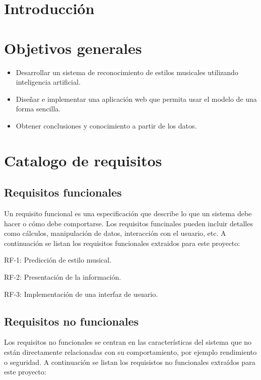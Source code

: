 
\section{Introducción}

\section{Objetivos generales}

\begin{itemize}
\tightlist
\item Desarrollar un sistema de reconocimiento de estilos musicales utilizando inteligencia artificial.
\item Diseñar e implementar una aplicación web que permita usar el modelo de una forma sencilla.
\item Obtener conclusiones y conocimiento a partir de los datos.
\end{itemize}

\section{Catalogo de requisitos}

\subsection{Requisitos funcionales}

Un requisito funcional es una especificación que describe lo que un sistema debe hacer o cómo debe comportarse.
Los requisitos funcinales pueden incluir detalles como cálculos, manipulación de datos, interacción con el usuario, etc.
A continuación se listan los requisitos funcionales extraidos para este proyecto:

RF-1: Predicción de estilo musical.

RF-2: Presentación de la información.

RF-3: Implementación de una interfaz de usuario.

\subsection{Requisitos no funcionales}

Los requisitos no funcionales se centran en las características del sistema que no están directamente relacionadas con su comportamiento, por ejemplo rendimiento o seguridad.
A continuación se listan los requisistos no funcionales extraídos para este proyecto:

